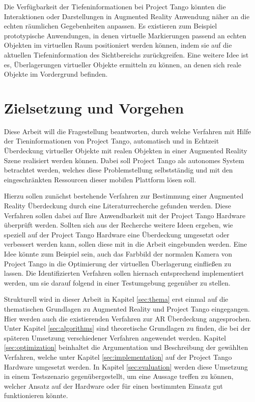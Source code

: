 Die Verfügbarkeit der Tiefeninformationen bei Project Tango könnten die Interaktionen oder Darstellungen in Augmented Reality Anwendung näher an die echten räumlichen Gegebenheiten anpassen. Es existieren zum Beispiel prototypische Anwendungen, in denen virtuelle Markierungen passend an echten Objekten im virtuellen Raum positioniert werden können, indem sie auf die aktuellen Tiefeninformation des Sichtbereichs zurückgreifen. Eine weitere Idee ist es, Überlagerungen virtueller Objekte ermitteln zu können, an denen sich reale Objekte im Vordergrund befinden.

\section{Zielsetzung und Vorgehen}

Diese Arbeit will die Fragestellung beantworten, durch welche Verfahren mit Hilfe der Tieninformationen von Project Tango, automatisch und in Echtzeit Überdeckung virtueller Objekte mit realen Objekten in einer Augmented Reality Szene realisiert werden können. Dabei soll Project Tango als autonomes System betrachtet werden, welches diese Problemstellung selbstständig und mit den eingeschränkten Ressourcen dieser mobilen Plattform lösen soll.

Hierzu sollen zunächst bestehende Verfahren zur Bestimmung einer Augmented Reality Überdeckung durch eine Literaturrecherche gefunden werden. Diese Verfahren sollen dabei auf Ihre Anwendbarkeit mit der Project Tango Hardware überprüft werden. Sollten sich aus der Recherche weitere Ideen ergeben, wie speziell auf der Project Tango Hardware eine Überdeckung umgesetzt oder verbessert werden kann, sollen diese mit in die Arbeit eingebunden werden. Eine Idee könnte zum Beispiel sein, auch das Farbbild der normalen Kamera von Project Tango in die Optimierung der virtuellen Überlagerung einfließen zu lassen. Die Identifizierten Verfahren sollen hiernach entsprechend implementiert werden, um sie darauf folgend in einer Testumgebung gegenüber zu stellen.

Strukturell wird in dieser Arbeit in Kapitel \ref{sec:thema} erst einmal auf die thematischen Grundlagen zu Augmented Reality und Project Tango eingegangen. Hier werden auch die existierenden Verfahren zur AR Überdeckung angesprochen. Unter Kapitel \ref{sec:algorithms} sind theoretische Grundlagen zu finden, die bei der späteren Umsetzung verschiedener Verfahren angewendet werden. Kapitel \ref{sec:optimization} beinhaltet die Argumentation und Beschreibung der gewählten Verfahren, welche unter Kapitel \ref{sec:implementation} auf der Project Tango Hardware umgesetzt werden. In Kapitel \ref{sec:evaluation} werden diese Umsetzung in einem Testszenario gegenübergestellt, um eine Aussage treffen zu können, welcher Ansatz auf der Hardware oder für einen bestimmten Einsatz gut funktionieren könnte.


